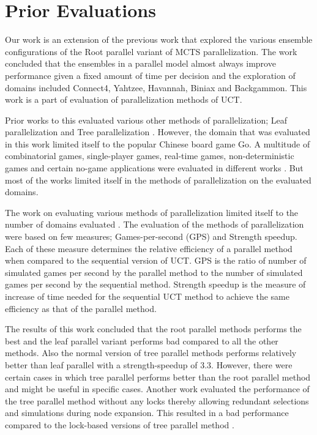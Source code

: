 \documentclass[double,12pt]{beavtex}
\begin{document}
\chapter{Prior Evaluations}
Our work is an extension of the previous work that explored the various ensemble configurations of the Root parallel variant of MCTS parallelization. The work concluded that the ensembles in a parallel model almost always improve performance given a fixed amount of time per decision \cite{fern2011ensemble} and the exploration of domains included Connect4, Yahtzee, Havannah, Biniax and Backgammon. This work is a part of evaluation of parallelization methods of UCT. 

Prior works to this evaluated various other methods of parallelization; Leaf parallelization and Tree parallelization \cite{chaslot2008parallel}. However, the domain that was evaluated in this work limited itself to the popular Chinese board game Go. A multitude of combinatorial games, single-player games, real-time games, non-deterministic games and certain no-game applications were evaluated in different works \cite{browne2012survey}. But most of the works limited itself in the methods of parallelization on the evaluated domains. 

The work on evaluating various methods of parallelization limited itself to the number of domains evaluated \cite{chaslot2008parallel}. The evaluation of the methods of parallelization were based on few measures; Games-per-second (GPS) and Strength speedup. Each of these measure determines the relative efficiency of a parallel method when compared to the sequential version of UCT. GPS is the ratio of number of simulated games per second by the parallel method to the number of simulated games per second by the sequential method. Strength speedup is the measure of increase of time needed for the sequential UCT method to achieve the same efficiency as that of the parallel method. 

The results of this work concluded that the root parallel methods performs the best and the leaf parallel variant performs bad compared to all the other methods. Also the normal version of tree parallel methods performs relatively better than leaf parallel with a strength-speedup of 3.3. However, there were certain cases in which tree parallel performs better than the root parallel method and might be useful in specific cases. Another work evaluated the performance of the tree parallel method without any locks thereby allowing redundant selections and simulations during node expansion. This resulted in a bad performance compared to the lock-based versions of tree parallel method \cite{enzenberger2010lock}.
\end{document}

